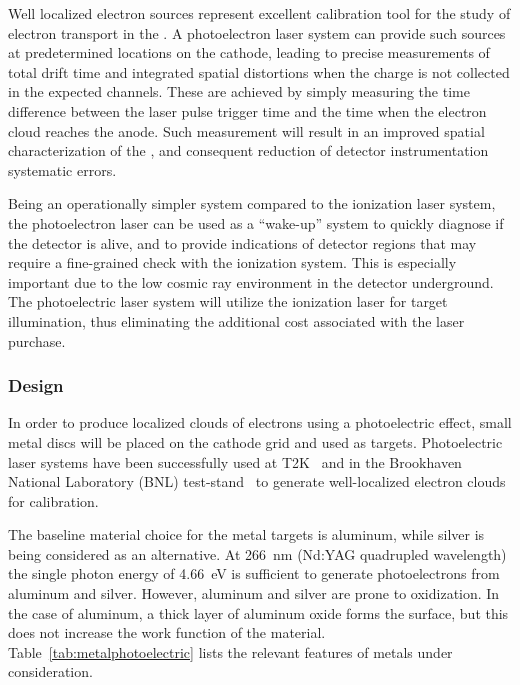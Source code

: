 
Well localized electron sources represent excellent calibration tool for the study of electron transport in the . 
A photoelectron laser system can provide such sources at predetermined locations on the cathode, leading to precise  measurements of total drift time and integrated spatial distortions when the charge is not collected in the expected channels. These are achieved by simply measuring the time difference between the laser pulse trigger time and the time when the electron cloud reaches the anode. Such measurement will result in an improved spatial characterization of the \efield, and consequent reduction of detector instrumentation systematic errors.

Being an operationally simpler system compared to the ionization laser system, the photoelectron laser can be used as a ``wake-up'' system to quickly diagnose if the detector is alive, and to provide indications of detector regions that may require a fine-grained check with the ionization system. This is especially important due to the low cosmic ray environment in the detector underground. The photoelectric laser system will utilize the ionization laser for target illumination, thus eliminating the additional cost associated with the laser purchase.


\subsubsection{Design}
\label{sec:dp-calib-sys-las-pe-des}

In order to produce localized clouds of electrons using a photoelectric effect, small metal discs will be placed on the cathode grid and used as targets. Photoelectric laser systems have been successfully used at T2K~\cite{Abgrall:2010hi} and in the Brookhaven National Laboratory (BNL)  test-stand~\cite{Li:2016ods} to generate well-localized electron clouds for \efield calibration. 

The baseline material choice for the metal targets is aluminum, while silver is being considered as an alternative. At \SI{266}{\nano\m} (Nd:YAG quadrupled wavelength) the single photon energy of \SI{4.66}{\eV} is sufficient to generate photoelectrons from aluminum and silver. However, aluminum and silver are prone to oxidization.
In the case of aluminum, a thick layer of aluminum oxide forms the surface, but this does not increase the work function of the material. Table~\ref{tab:metalphotoelectric} lists the relevant features of metals under consideration.  

